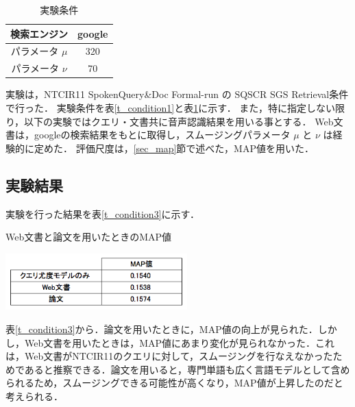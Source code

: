 \begin{table}[htbp]
    \begin{center}
        \caption{実験条件}
        \begin{tabular}{|c|c|}
            \hline
            検索エンジン & google \\ \hline
            パラメータ $\mu$ & 320 \\ \hline
            パラメータ $\nu$ & 70 \\ \hline
        \end{tabular}
        \label{t_condition2}
    \end{center}
\end{table}

実験は，NTCIR11 SpokenQuery\&Doc Formal-run の SQSCR SGS Retrieval条件で行った．
実験条件を表\ref{t_condition1}と表\ref{t_condition2}に示す．
また，特に指定しない限り，以下の実験ではクエリ・文書共に音声認識結果を用いる事とする．
Web文書は，googleの検索結果をもとに取得し，スムージングパラメータ $\mu$ と $\nu$ は経験的に定めた．
評価尺度は，\ref{sec_map}節で述べた，MAP値を用いた．

\subsection{実験結果}
実験を行った結果を表\ref{t_condition3}に示す．

\begin{table}[htbp]
    \centering
    \caption{Web文書と論文を用いたときのMAP値}
    \includegraphics[width=7cm]{./image/t_condition.png}
    \label{t_condition3}
\end{table}

表\ref{t_condition3}から．論文を用いたときに，MAP値の向上が見られた．しかし，Web文書を用いたときは，MAP値にあまり変化が見られなかった．これは，Web文書がNTCIR11のクエリに対して，スムージングを行なえなかったためであると推察できる．論文を用いると，専門単語も広く言語モデルとして含められるため，スムージングできる可能性が高くなり，MAP値が上昇したのだと考えられる．








